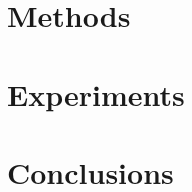 \documentclass[final]{cvpr}
\begin{document}
\section{Methods}
\section{Experiments}
\section{Conclusions}




\end{document}
